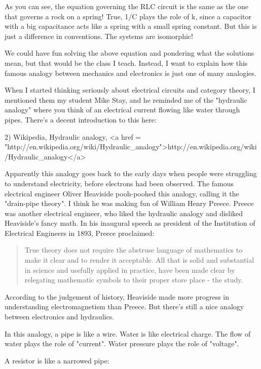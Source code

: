 As you can see, the equation governing the RLC circuit is the same as
the one that governs a rock on a spring!  True, 1/C plays the role of
k, since a capacitor with a big capacitance acts like a spring with a
small spring constant.  But this is just a difference in conventions.
The systems are isomorphic!

We could have fun solving the above equation and pondering what the 
solutions mean, but that would be the class I teach.  Instead,
I want to explain how this famous analogy between mechanics and 
electronics is just one of many analogies.

When I started thinking seriously about electrical circuits and
category theory, I mentioned them my student Mike Stay, and he
reminded me of the "hydraulic analogy" where you think of an
electrical current flowing like water through pipes.  There's a 
decent introduction to this here:

2) Wikipedia, Hydraulic analogy, 
<a href = "http://en.wikipedia.org/wiki/Hydraulic_analogy">http://en.wikipedia.org/wiki/Hydraulic_analogy</a>
 
Apparently this analogy goes back to the early days when people were
struggling to understand electricity, before electrons had been
observed.  The famous electrical engineer Oliver Heaviside pooh-poohed
this analogy, calling it the "drain-pipe theory".  I think
he was making fun of William Henry Preece.  Preece was another
electrical engineer, who liked the hydraulic analogy and disliked
Heaviside's fancy math.  In his inaugural speech as president of the
Institution of Electrical Engineers in 1893, Preece proclaimed:

\begin{quote}
  True theory does not require the abstruse language of mathematics to 
  make it clear and to render it acceptable.   All that is solid and 
  substantial in science and usefully applied in practice, have been 
  made clear by relegating mathematic symbols to their proper store 
  place - the study.
\end{quote}

According to the judgement of history, Heaviside made more progress in
understanding electromagnetism than Preece.  But there's still a nice
analogy between electronics and hydraulics.

In this analogy, a pipe is like a wire.  Water is like electrical
charge.  The flow of water plays the role of "current".
Water pressure plays the role of "voltage".

A resistor is like a narrowed pipe:

